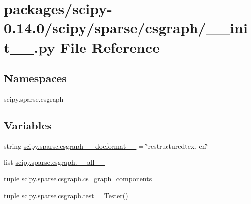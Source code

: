 \hypertarget{packages_2scipy-0_814_80_2scipy_2sparse_2csgraph_2____init_____8py}{}\section{packages/scipy-\/0.14.0/scipy/sparse/csgraph/\+\_\+\+\_\+init\+\_\+\+\_\+.py File Reference}
\label{packages_2scipy-0_814_80_2scipy_2sparse_2csgraph_2____init_____8py}
\subsection*{Namespaces}
\begin{DoxyCompactItemize}
\item 
 \hyperlink{namespacescipy_1_1sparse_1_1csgraph}{scipy.\+sparse.\+csgraph}
\end{DoxyCompactItemize}
\subsection*{Variables}
\begin{DoxyCompactItemize}
\item 
string \hyperlink{namespacescipy_1_1sparse_1_1csgraph_ad809c379a5b7654e8e0a794daad65293}{scipy.\+sparse.\+csgraph.\+\_\+\+\_\+docformat\+\_\+\+\_\+} = \char`\"{}restructuredtext en\char`\"{}
\item 
list \hyperlink{namespacescipy_1_1sparse_1_1csgraph_a0d2763aed53deb59f8e760fcdd1b2c65}{scipy.\+sparse.\+csgraph.\+\_\+\+\_\+all\+\_\+\+\_\+}
\item 
tuple \hyperlink{namespacescipy_1_1sparse_1_1csgraph_a5180c25e1d6d99f0df41c6127fac17d9}{scipy.\+sparse.\+csgraph.\+cs\+\_\+graph\+\_\+components}
\item 
tuple \hyperlink{namespacescipy_1_1sparse_1_1csgraph_ad13a5a91bd84dd248acba206b634476d}{scipy.\+sparse.\+csgraph.\+test} = Tester()
\end{DoxyCompactItemize}
